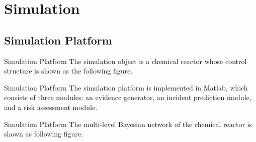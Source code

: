 \section{Simulation}
\subsection{Simulation Platform}
\begin{frame}{Simulation Platform}
    The simulation object is a chemical reactor whose control structure is shown as the following figure.\\[-10pt]
    \begin{center}
      
    \end{center}
\end{frame}

\begin{frame}{Simulation Platform}
    The simulation platform is implemented in Matlab, which consists of three modules: an evidence generator, an incident prediction module, and a risk assessment module.
    \begin{center}
      
    \end{center}
\end{frame}

\begin{frame}{Simulation Platform}
    The multi-level Bayesian network of the chemical reactor is shown as following figure.\vspace{-18pt}\\
    \begin{center}
      
    \end{center}
\end{frame}

